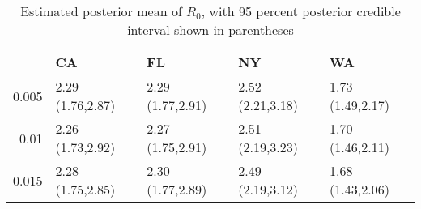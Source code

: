 \begin{table}[ht]
\centering
\begingroup\footnotesize
\begin{tabular}{rllll}
  \hline
 & CA & FL & NY & WA \\ 
  \hline
0.005 & 2.29 (1.76,2.87) & 2.29 (1.77,2.91) & 2.52 (2.21,3.18) & 1.73 (1.49,2.17) \\ 
  0.01 & 2.26 (1.73,2.92) & 2.27 (1.75,2.91) & 2.51 (2.19,3.23) & 1.70 (1.46,2.11) \\ 
  0.015 & 2.28 (1.75,2.85) & 2.30 (1.77,2.89) & 2.49 (2.19,3.12) & 1.68 (1.43,2.06) \\ 
   \hline
\end{tabular}
\endgroup
\caption{Estimated posterior mean of $R_{0}$, with 95 percent posterior credible interval shown in parentheses 
             \label{tab:R0}} 
\end{table}

